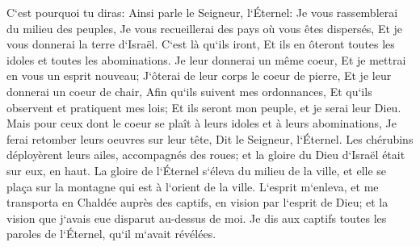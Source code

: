 \verse C`est pourquoi tu diras: Ainsi parle le Seigneur, l`Éternel: Je vous rassemblerai du milieu des peuples, Je vous recueillerai des pays où vous êtes dispersés, Et je vous donnerai la terre d`Israël. 
\verse C`est là qu`ils iront, Et ils en ôteront toutes les idoles et toutes les abominations. 
\verse Je leur donnerai un même coeur, Et je mettrai en vous un esprit nouveau; J`ôterai de leur corps le coeur de pierre, Et je leur donnerai un coeur de chair, 
\verse Afin qu`ils suivent mes ordonnances, Et qu`ils observent et pratiquent mes lois; Et ils seront mon peuple, et je serai leur Dieu. 
\verse Mais pour ceux dont le coeur se plaît à leurs idoles et à leurs abominations, Je ferai retomber leurs oeuvres sur leur tête, Dit le Seigneur, l`Éternel. 
\verse Les chérubins déployèrent leurs ailes, accompagnés des roues; et la gloire du Dieu d`Israël était sur eux, en haut. 
\verse La gloire de l`Éternel s`éleva du milieu de la ville, et elle se plaça sur la montagne qui est à l`orient de la ville. 
\verse L`esprit m`enleva, et me transporta en Chaldée auprès des captifs, en vision par l`esprit de Dieu; et la vision que j`avais eue disparut au-dessus de moi. 
\verse Je dis aux captifs toutes les paroles de l`Éternel, qu`il m`avait révélées. 


